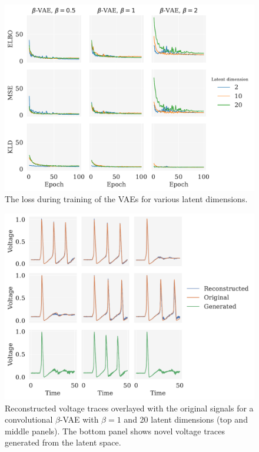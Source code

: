 \begin{figure}[!htb]
\begin{center}\includegraphics[scale=0.75]{latex/figures/hh_loss_latent_dim_conv_beta_vae.pdf}
\end{center}
\caption{The loss during training of the VAEs for various latent dimensions.}
\label{fig:hh_loss_vs_epoch}
\end{figure}

\begin{figure}[!htb]
\begin{center}\includegraphics[scale=0.75]{latex/figures/hh_conv_vae_beta_1_z_20.pdf}
\end{center}
\caption{Reconstructed voltage traces overlayed with the original signals for a convolutional $\beta$-VAE with $\beta=1$ and 20 latent dimensions (top and middle panels). The bottom panel shows novel voltage traces generated from the latent space.}
\label{fig:hh_conv_vae_beta_1_z_20}
\end{figure}

